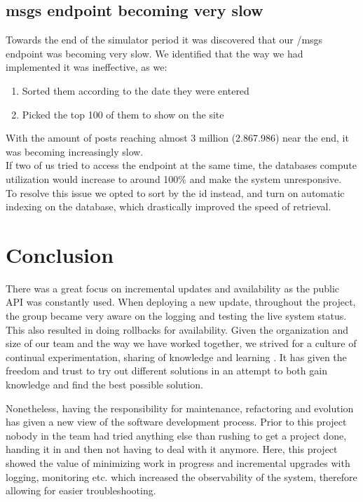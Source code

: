 \subsection{msgs endpoint becoming very slow}
Towards the end of the simulator period it was discovered that our /msgs endpoint was becoming very slow.
We identified that the way we had implemented it was ineffective, as we: 
\begin{enumerate}
    \item Sorted them according to the date they were entered 
    \item Picked the top 100 of them to show on the site
\end{enumerate}
With the amount of posts reaching almost 3 million (2.867.986) near the end, it was becoming increasingly slow. \\ 
If two of us tried to access the endpoint at the same time, the databases compute utilization would increase to around 100\% and make the system unresponsive. \\
To resolve this issue we opted to sort by the id instead, and turn on automatic indexing on the database, which drastically improved the speed of retrieval.

\section{Conclusion}
There was a great focus on incremental updates and availability as the public API was constantly used. When deploying a new update, throughout the project, the group became very aware on the logging and testing the live system status. This also resulted in doing rollbacks for availability. Given the organization and size of our team and the way we have worked together, we strived for a culture of continual experimentation, sharing of knowledge and learning \cite{devopshandbook}. It has given the freedom and trust to try out different solutions in an attempt to both gain knowledge and find the best possible solution.

Nonetheless, having the responsibility for maintenance, refactoring and evolution has given a new view of the software development process. Prior to this project nobody in the team had tried anything else than rushing to get a project done, handing it in and then not having to deal with it anymore. Here, this project showed the value of minimizing work in progress and incremental upgrades with logging, monitoring etc. which increased the observability of the system, therefore allowing for easier troubleshooting.
